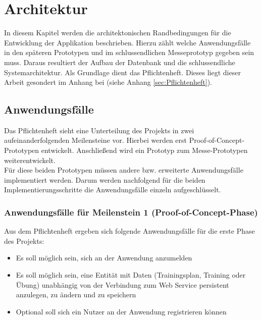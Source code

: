 \chapter{Architektur}
\label{cha:architektur}
In diesem Kapitel werden die architektonischen Randbedingungen für die Entwicklung der Applikation beschrieben. Hierzu zählt welche Anwendungsfälle in den späteren Prototypen und im schlussendlichen Messeprototyp gegeben sein muss. Daraus resultiert der Aufbau der Datenbank und die schlussendliche Systemarchitektur. Als Grundlage dient das Pflichtenheft. Dieses liegt dieser Arbeit gesondert im Anhang bei (siehe Anhang \ref{sec:Pflichtenheft}).

\section{Anwendungsfälle}
\label{sec:anwendungsfaelle}
Das Pflichtenheft sieht eine Unterteilung des Projekts in zwei aufeinanderfolgenden Meilensteine vor. Hierbei werden erst Proof-of-Concept-Prototypen entwickelt. Anschließend wird ein Prototyp zum Messe-Prototypen weiterentwickelt. \\
Für diese beiden Prototypen müssen andere bzw. erweiterte Anwendungsfälle implementiert werden. Darum werden nachfolgend für die beiden Implementierungsschritte die Anwendungsfälle einzeln aufgeschlüsselt. 
\subsection{Anwendungsfälle für Meilenstein 1 (Proof-of-Concept-Phase)}
\label{ssec:anwendungsfaelle-poc}
Aus dem Pflichtenheft ergeben sich folgende Anwendungsfälle für die erste Phase des Projekts:
\begin{itemize}
\item Es soll möglich sein, sich an der Anwendung anzumelden
\item Es soll möglich sein, eine Entität mit Daten (Trainingsplan, Training oder Übung) unabhängig von der Verbindung zum Web Service persistent anzulegen, zu ändern und zu speichern
\item Optional soll sich ein Nutzer an der Anwendung registrieren können
\end{itemize}

